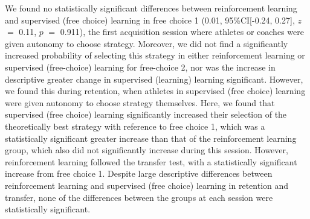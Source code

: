 We found no statistically significant differences between reinforcement learning and supervised (free choice) learning in free choice 1 (0.01, 95\%CI[-0.24, 0.27], $z$ $=$ 0.11, $p$ $=$ 0.911), the first acquisition session where athletes or coaches were given autonomy to choose strategy. Moreover, we did not find a significantly increased probability of selecting this strategy in either reinforcement learning or supervised (free-choice) learning for free-choice 2, nor was the increase in descriptive greater change in supervised (learning) learning significant. However, we found this during retention, when athletes in supervised (free choice) learning were given autonomy to choose strategy themselves. Here, we found that supervised (free choice) learning significantly increased their selection of the theoretically best strategy with reference to free choice 1, which was a statistically significant greater increase than that of the reinforcement learning group, which also did not significantly increase during this session. However, reinforcement learning followed the transfer test, with a statistically significant increase from free choice 1. Despite large descriptive differences between reinforcement learning and supervised (free choice) learning in retention and transfer, none of the differences between the groups at each session were statistically significant.